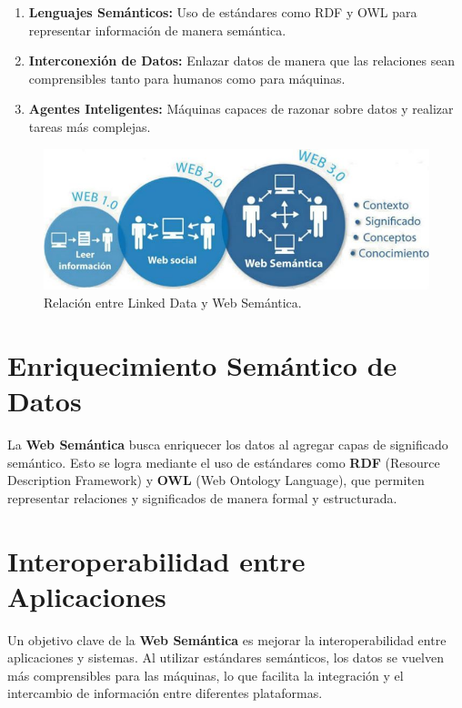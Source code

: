 \documentclass[11pt]{report}
\begin{document}
	\begin{enumerate}
		\item \textbf{Lenguajes Semánticos:} Uso de estándares como RDF y OWL para representar información de manera semántica.
	   
		\item \textbf{Interconexión de Datos:} Enlazar datos de manera que las relaciones sean comprensibles tanto para humanos como para máquinas.
		
		\item \textbf{Agentes Inteligentes:} Máquinas capaces de razonar sobre datos y realizar tareas más complejas.
	\end{enumerate}
		
	\begin{figure}[H]
		\centering
		\includegraphics[scale=0.4]{../img/websemantica.jpg}
		\caption{Relación entre Linked Data y Web Semántica.}
		\label{fig:websemantica}
	\end{figure}

	\section{Enriquecimiento Semántico de Datos}

	La \textbf{Web Semántica} busca enriquecer los datos al agregar capas de significado semántico. Esto se logra mediante el uso de estándares como \textbf{RDF} (Resource Description Framework) y \textbf{OWL} (Web Ontology Language), que permiten representar relaciones y significados de manera formal y estructurada.

	\section{Interoperabilidad entre Aplicaciones}

	Un objetivo clave de la \textbf{Web Semántica} es mejorar la interoperabilidad entre aplicaciones y sistemas. Al utilizar estándares semánticos, los datos se vuelven más comprensibles para las máquinas, lo que facilita la integración y el intercambio de información entre diferentes plataformas.
\end{document}
